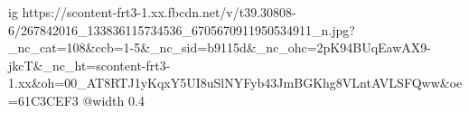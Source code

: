  
 
 
 
 

\ifcmt
  ig https://scontent-frt3-1.xx.fbcdn.net/v/t39.30808-6/267842016_133836115734536_6705670911950534911_n.jpg?_nc_cat=108&ccb=1-5&_nc_sid=b9115d&_nc_ohc=2pK94BUqEawAX9-jkcT&_nc_ht=scontent-frt3-1.xx&oh=00_AT8RTJ1yKqxY5UI8uSlNYFyb43JmBGKhg8VLntAVLSFQww&oe=61C3CEF3
  @width 0.4
\fi
